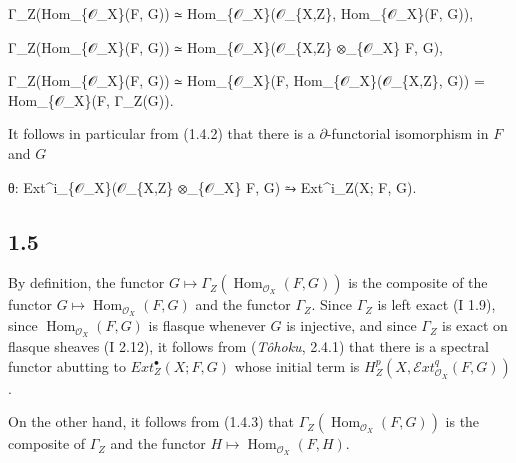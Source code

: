\documentclass[
  11pt,
  a4paper,
]{book}
\newenvironment{Shaded}{}{}
\newcommand{\NormalTok}[1]{#1}
\begin{document}
\begin{Shaded}
\begin{Highlighting}[]
\NormalTok{Γ\_Z(Hom\_\{𝒪\_X\}(F, G)) ≃ Hom\_\{𝒪\_X\}(𝒪\_\{X,Z\}, Hom\_\{𝒪\_X\}(F, G)),}
\end{Highlighting}
\end{Shaded}

\begin{Shaded}
\begin{Highlighting}[]
\NormalTok{Γ\_Z(Hom\_\{𝒪\_X\}(F, G)) ≃ Hom\_\{𝒪\_X\}(𝒪\_\{X,Z\} ⊗\_\{𝒪\_X\} F, G),}
\end{Highlighting}
\end{Shaded}

\begin{Shaded}
\begin{Highlighting}[]
\NormalTok{Γ\_Z(Hom\_\{𝒪\_X\}(F, G)) ≃ Hom\_\{𝒪\_X\}(F, Hom\_\{𝒪\_X\}(𝒪\_\{X,Z\}, G)) = Hom\_\{𝒪\_X\}(F, Γ\_Z(G)).}
\end{Highlighting}
\end{Shaded}

It follows in particular from (1.4.2) that there is a
\(\partial\)-functorial isomorphism in \(F\) and \(G\)

\begin{Shaded}
\begin{Highlighting}[]
\NormalTok{θ: Ext\^{}i\_\{𝒪\_X\}(𝒪\_\{X,Z\} ⊗\_\{𝒪\_X\} F, G) ⥲ Ext\^{}i\_Z(X; F, G).}
\end{Highlighting}
\end{Shaded}

\subsection{1.5}\label{section-2}

By definition, the functor
\(G \mapsto \Gamma_{Z}(\operatorname{Hom}_{\mathcal{O}_{X}}(F, G))\) is
the composite of the functor
\(G \mapsto \operatorname{Hom}_{\mathcal{O}_{X}}(F, G)\) and the functor
\(\Gamma_{Z}\). Since \(\Gamma_{Z}\) is left exact (I 1.9), since
\(\operatorname{Hom}_{\mathcal{O}_{X}}(F, G)\) is flasque whenever \(G\)
is injective, and since \(\Gamma_{Z}\) is exact on flasque sheaves (I
2.12), it follows from (\emph{Tôhoku}, 2.4.1) that there is a spectral
functor abutting to \(Ext^{\bullet}_{Z}(X; F, G)\) whose initial term is
\(H^{p}_{Z}(X, \mathcal{E}xt^{q}_{\mathcal{O}_{X}}(F,
G))\).

On the other hand, it follows from (1.4.3) that
\(\Gamma_{Z}(\operatorname{Hom}_{\mathcal{O}_{X}}(F, G))\) is the
composite of \(\Gamma_{Z}\) and the functor
\(H \mapsto \operatorname{Hom}_{\mathcal{O}_{X}}(F, H)\).
\end{document}
